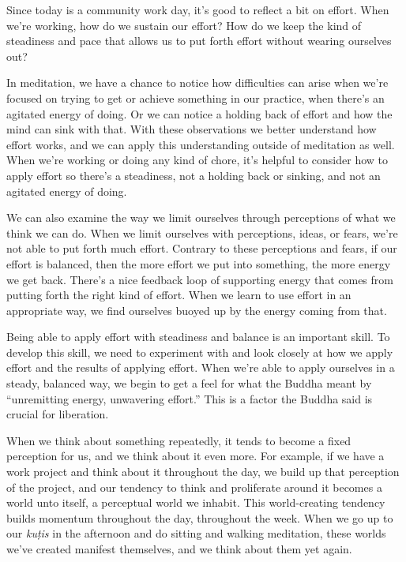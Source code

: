 
Since today is a community work day, it's good to reflect a bit on 
effort. When we're working, how do we sustain our effort? How do we 
keep the kind of steadiness and pace that allows us to put forth effort 
without wearing ourselves out?

In meditation, we have a chance to notice how difficulties can arise 
when we're focused on trying to get or achieve something in our 
practice, when there's an agitated energy of doing. Or we can notice a 
holding back of effort and how the mind can sink with that. With these 
observations we better understand how effort works, and we can apply 
this understanding outside of meditation as well. When we're working or 
doing any kind of chore, it's helpful to consider how to apply effort 
so there's a steadiness, not a holding back or sinking, and not an 
agitated energy of doing.

We can also examine the way we limit ourselves through perceptions of 
what we think we can do. When we limit ourselves with perceptions, 
ideas, or fears, we're not able to put forth much effort. Contrary to 
these perceptions and fears, if our effort is balanced, then the more 
effort we put into something, the more energy we get back. There's a 
nice feedback loop of supporting energy that comes from putting forth 
the right kind of effort. When we learn to use effort in an appropriate 
way, we find ourselves buoyed up by the energy coming from that.

Being able to apply effort with steadiness and balance is an important 
skill. To develop this skill, we need to experiment with and look 
closely at how we apply effort and the results of applying effort. When 
we're able to apply ourselves in a steady, balanced way, we begin to 
get a feel for what the Buddha meant by ``unremitting energy, 
unwavering effort.'' This is a factor the Buddha said is crucial for 
liberation.


When we think about something repeatedly, it tends to become a fixed 
perception for us, and we think about it even more. For example, if we 
have a work project and think about it throughout the day, we build up 
that perception of the project, and our tendency to think and 
proliferate around it becomes a world unto itself, a perceptual world 
we inhabit. This world-creating tendency builds momentum throughout the 
day, throughout the week. When we go up to our \emph{kuṭis} in the 
afternoon and do sitting and walking meditation, these worlds we've 
created manifest themselves, and we think about them yet again.


